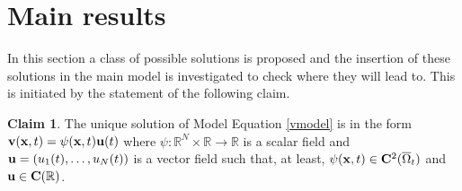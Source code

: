 \documentclass[a4 paper, 11pt,twoside]{article}
\newcommand{\Bf}[1]{{\bf{#1}}}
\newcommand{\V}{{\bf{v}}}
\newcommand{\X}{{\bf{x}}}
\newcommand{\U}{{\bf{u}}}
\newcommand{\0}{\Bf{0}}
\theoremstyle{definition}
\newtheorem{Claim}{Claim}
\begin{document}
\section{Main results}
In this section a class of possible solutions is proposed and the insertion of these solutions in the main model is investigated to check where they will lead to. This is initiated by the statement of the following claim.

\begin{Claim}
The unique solution of Model Equation \eqref{vmodel} is in the form $\V(\X,t)=\psi(\X,t)\U(t)$ where $\psi:\mathbb{R}^N\times\mathbb{R}\rightarrow\mathbb{R}$ is a scalar field and $\Bf{u}=(u_1(t),\dots,u_N(t))$ is a vector field such that, at least, $\psi(\X,t)\in\Bf{C}^2(\overline{\Omega}_t)$ and $\U\in\Bf{C}(\mathbb{R})$.
\label{claim1}
\end{Claim}
\end{document}

